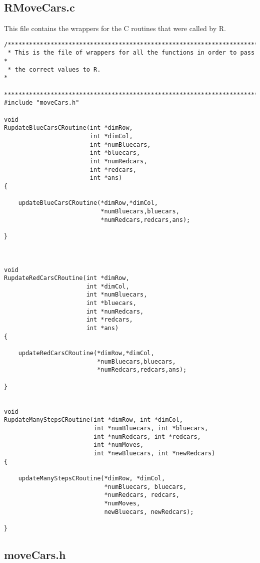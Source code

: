 \documentclass[11pt]{article}
\begin{document}
\subsection{RMoveCars.c}
\label{sec-4-2}

   This file contains the wrappers for the C routines that were called
   by R.

\begin{verbatim}
/***********************************************************************
 * This is the file of wrappers for all the functions in order to pass *
 * the correct values to R.                                            *
 ***********************************************************************/
#include "moveCars.h"

void
RupdateBlueCarsCRoutine(int *dimRow, 
                        int *dimCol,
                        int *numBluecars,
                        int *bluecars,
                        int *numRedcars,
                        int *redcars,
                        int *ans)
{

    updateBlueCarsCRoutine(*dimRow,*dimCol,
                           *numBluecars,bluecars,
                           *numRedcars,redcars,ans);

}



void 
RupdateRedCarsCRoutine(int *dimRow,
                       int *dimCol,
                       int *numBluecars,
                       int *bluecars,
                       int *numRedcars,
                       int *redcars,
                       int *ans)
{

    updateRedCarsCRoutine(*dimRow,*dimCol,
                          *numBluecars,bluecars,
                          *numRedcars,redcars,ans);

}


void
RupdateManyStepsCRoutine(int *dimRow, int *dimCol,
                         int *numBluecars, int *bluecars,
                         int *numRedcars, int *redcars,
                         int *numMoves,
                         int *newBluecars, int *newRedcars)
{

    updateManyStepsCRoutine(*dimRow, *dimCol,
                            *numBluecars, bluecars,
                            *numRedcars, redcars,
                            *numMoves,
                            newBluecars, newRedcars);

}
\end{verbatim}
\subsection{moveCars.h}
\label{sec-4-3}
\end{document}
